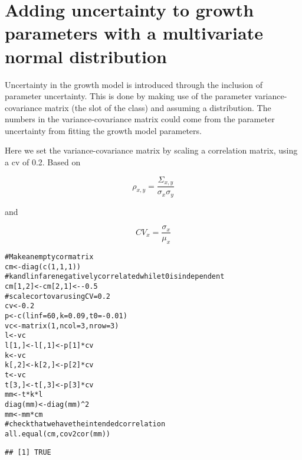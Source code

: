 \documentclass[a4paper,english,10pt]{article}\usepackage[]{graphicx}\usepackage[]{color}
\makeatletter
\newcommand{\hlnum}[1]{\textcolor[rgb]{0.063,0.58,0.627}{#1}}%
\newcommand{\hlcom}[1]{\textcolor[rgb]{0.588,0.588,0.588}{#1}}%
\newcommand{\hlopt}[1]{\textcolor[rgb]{0.196,0.196,0.196}{#1}}%
\newcommand{\hlstd}[1]{\textcolor[rgb]{0.196,0.196,0.196}{#1}}%
\newcommand{\hlkwb}[1]{\textcolor[rgb]{0.627,0,0.314}{#1}}%
\newcommand{\hlkwc}[1]{\textcolor[rgb]{0,0.631,0.314}{#1}}%
\newcommand{\hlkwd}[1]{\textcolor[rgb]{0.78,0.227,0.412}{#1}}%
\newenvironment{kframe}{%
 \def\at@end@of@kframe{}%
 \ifinner\ifhmode%
  \def\at@end@of@kframe{\end{minipage}}%
  \begin{minipage}{\columnwidth}%
 \fi\fi%
 \def\FrameCommand##1{\hskip\@totalleftmargin \hskip-\fboxsep
 \colorbox{shadecolor}{##1}\hskip-\fboxsep
     \hskip-\linewidth \hskip-\@totalleftmargin \hskip\columnwidth}%
 \MakeFramed {\advance\hsize-\width
   \@totalleftmargin\z@ \linewidth\hsize
   \@setminipage}}%
 {\par\unskip\endMakeFramed%
 \at@end@of@kframe}
\newenvironment{knitrout}{}{} %
\makeatother
\begin{document}
\section{Adding uncertainty to growth parameters with a multivariate normal distribution}

Uncertainty in the growth model is introduced through the inclusion of parameter uncertainty.
This is done by making use of the parameter variance-covariance matrix (the  slot of the  class) and assuming a distribution. The numbers in the variance-covariance matrix could come from the parameter uncertainty from fitting the growth model parameters.

Here we set the variance-covariance matrix by scaling a correlation matrix, using a cv of 0.2. Based on 

$$\rho_{x,y}=\frac{\Sigma_{x,y}}{\sigma_x \sigma_y}$$

and 

$$CV_x=\frac{\sigma_x}{\mu_x}$$

\begin{knitrout}
\color{fgcolor}\begin{kframe}
\begin{alltt}
\hlcom{# Make an empty cor matrix}
\hlstd{cm} \hlkwb{<-} \hlkwd{diag}\hlstd{(}\hlkwd{c}\hlstd{(}\hlnum{1}\hlstd{,} \hlnum{1}\hlstd{,} \hlnum{1}\hlstd{))}
\hlcom{# k and linf are negatively correlated while t0 is independent}
\hlstd{cm[}\hlnum{1}\hlstd{,} \hlnum{2}\hlstd{]} \hlkwb{<-} \hlstd{cm[}\hlnum{2}\hlstd{,} \hlnum{1}\hlstd{]} \hlkwb{<-} \hlopt{-}\hlnum{0.5}
\hlcom{# scale cor to var using CV=0.2}
\hlstd{cv} \hlkwb{<-} \hlnum{0.2}
\hlstd{p} \hlkwb{<-} \hlkwd{c}\hlstd{(}\hlkwc{linf} \hlstd{=} \hlnum{60}\hlstd{,} \hlkwc{k} \hlstd{=} \hlnum{0.09}\hlstd{,} \hlkwc{t0} \hlstd{=} \hlopt{-}\hlnum{0.01}\hlstd{)}
\hlstd{vc} \hlkwb{<-} \hlkwd{matrix}\hlstd{(}\hlnum{1}\hlstd{,} \hlkwc{ncol} \hlstd{=} \hlnum{3}\hlstd{,} \hlkwc{nrow} \hlstd{=} \hlnum{3}\hlstd{)}
\hlstd{l} \hlkwb{<-} \hlstd{vc}
\hlstd{l[}\hlnum{1}\hlstd{, ]} \hlkwb{<-} \hlstd{l[,} \hlnum{1}\hlstd{]} \hlkwb{<-} \hlstd{p[}\hlnum{1}\hlstd{]} \hlopt{*} \hlstd{cv}
\hlstd{k} \hlkwb{<-} \hlstd{vc}
\hlstd{k[,} \hlnum{2}\hlstd{]} \hlkwb{<-} \hlstd{k[}\hlnum{2}\hlstd{, ]} \hlkwb{<-} \hlstd{p[}\hlnum{2}\hlstd{]} \hlopt{*} \hlstd{cv}
\hlstd{t} \hlkwb{<-} \hlstd{vc}
\hlstd{t[}\hlnum{3}\hlstd{, ]} \hlkwb{<-} \hlstd{t[,} \hlnum{3}\hlstd{]} \hlkwb{<-} \hlstd{p[}\hlnum{3}\hlstd{]} \hlopt{*} \hlstd{cv}
\hlstd{mm} \hlkwb{<-} \hlstd{t} \hlopt{*} \hlstd{k} \hlopt{*} \hlstd{l}
\hlkwd{diag}\hlstd{(mm)} \hlkwb{<-} \hlkwd{diag}\hlstd{(mm)}\hlopt{^}\hlnum{2}
\hlstd{mm} \hlkwb{<-} \hlstd{mm} \hlopt{*} \hlstd{cm}
\hlcom{# check that we have the intended correlation}
\hlkwd{all.equal}\hlstd{(cm,} \hlkwd{cov2cor}\hlstd{(mm))}
\end{alltt}
\begin{verbatim}
## [1] TRUE
\end{verbatim}
\end{kframe}
\end{knitrout}
\end{document}
